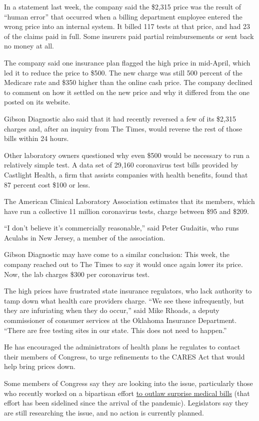 In a statement last week, the company said the \$2,315 price was the
result of ``human error'' that occurred when a billing department
employee entered the wrong price into an internal system. It billed 117
tests at that price, and had 23 of the claims paid in full. Some
insurers paid partial reimbursements or sent back no money at all.

The company said one insurance plan flagged the high price in mid-April,
which led it to reduce the price to \$500. The new charge was still 500
percent of the Medicare rate and \$350 higher than the online cash
price. The company declined to comment on how it settled on the new
price and why it differed from the one posted on its website.

Gibson Diagnostic also said that it had recently reversed a few of its
\$2,315 charges and, after an inquiry from The Times, would reverse the
rest of those bills within 24 hours.

Other laboratory owners questioned why even \$500 would be necessary to
run a relatively simple test. A data set of 29,160 coronavirus test
bills provided by Castlight Health, a firm that assists companies with
health benefits, found that 87 percent cost \$100 or less.

The American Clinical Laboratory Association estimates that its members,
which have run a collective 11 million coronavirus tests, charge between
\$95 and \$209.

``I don't believe it's commercially reasonable,'' said Peter Gudaitis,
who runs Aculabs in New Jersey, a member of the association.

Gibson Diagnostic may have come to a similar conclusion: This week, the
company reached out to The Times to say it would once again lower its
price. Now, the lab charges \$300 per coronavirus test.

The high prices have frustrated state insurance regulators, who lack
authority to tamp down what health care providers charge. ``We see these
infrequently, but they are infuriating when they do occur,'' said Mike
Rhoads, a deputy commissioner of consumer services at the Oklahoma
Insurance Department. ``There are free testing sites in our state. This
does not need to happen.''

He has encouraged the administrators of health plans he regulates to
contact their members of Congress, to urge refinements to the CARES Act
that would help bring prices down.

Some members of Congress say they are looking into the issue,
particularly those who recently worked on a bipartisan effort
\href{https://www.nytimes.com/2019/12/17/upshot/surprise-billing-democrats-2020.html}{to
outlaw surprise medical bills} (that effort has been sidelined since the
arrival of the pandemic). Legislators say they are still researching the
issue, and no action is currently planned.

